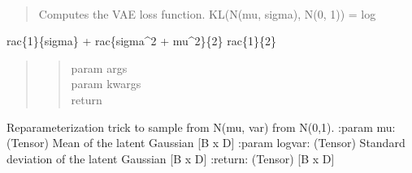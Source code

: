 \documentclass[letterpaper,10pt,english]{sphinxmanual}
\begin{document}
\begin{fulllineitems}
\begin{fulllineitems}
\end{fulllineitems}


\begin{fulllineitems}
\label{\detokenize{pages/ml:vipercore.ml.models.GolgiVAE.loss_function}}~\begin{quote}

\sphinxAtStartPar
Computes the VAE loss function.
KL(N(mu, sigma), N(0, 1)) = log
\end{quote}

\sphinxAtStartPar
rac\{1\}\{sigma\} +
rac\{sigma\textasciicircum{}2 + mu\textasciicircum{}2\}\{2\} \sphinxhyphen{}
rac\{1\}\{2\}
\begin{quote}
\begin{quote}\begin{description}
\item[{param args}] \leavevmode
\item[{param kwargs}] \leavevmode
\item[{return}] \leavevmode
\end{description}\end{quote}
\end{quote}

\end{fulllineitems}


\begin{fulllineitems}
\label{\detokenize{pages/ml:vipercore.ml.models.GolgiVAE.reparameterize}}
\sphinxAtStartPar
Reparameterization trick to sample from N(mu, var) from
N(0,1).
:param mu: (Tensor) Mean of the latent Gaussian {[}B x D{]}
:param logvar: (Tensor) Standard deviation of the latent Gaussian {[}B x D{]}
:return: (Tensor) {[}B x D{]}

\end{fulllineitems}


\end{fulllineitems}
\end{document}
